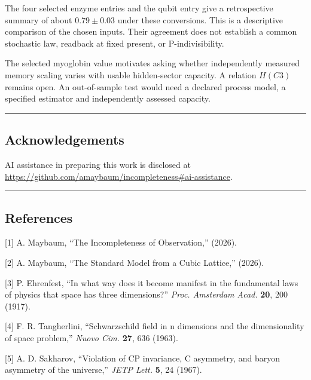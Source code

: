 \documentclass[
]{article}
\begin{document}
The four selected enzyme entries and the qubit entry give a
retrospective summary of about \(0.79\pm 0.03\) under these conversions.
This is a descriptive comparison of the chosen inputs. Their agreement
does not establish a common stochastic law, readback at fixed present,
or P-indivisibility.

The selected myoglobin value motivates asking whether independently
measured memory scaling varies with usable hidden-sector capacity. A
relation \(H(C3)\) remains open. An out-of-sample test would need a
declared process model, a specified estimator and independently assessed
capacity.

\begin{center}\rule{0.5\linewidth}{0.5pt}\end{center}

\hypertarget{acknowledgements}{%
\subsection{Acknowledgements}\label{acknowledgements}}

AI assistance in preparing this work is disclosed at\\
\url{https://github.com/amaybaum/incompleteness\#ai-assistance}.

\begin{center}\rule{0.5\linewidth}{0.5pt}\end{center}

\hypertarget{references}{%
\subsection{References}\label{references}}

{[}1{]} A. Maybaum, ``The Incompleteness of Observation,'' (2026).

{[}2{]} A. Maybaum, ``The Standard Model from a Cubic Lattice,'' (2026).

{[}3{]} P. Ehrenfest, ``In what way does it become manifest in the
fundamental laws of physics that space has three dimensions?''
\emph{Proc. Amsterdam Acad.} \textbf{20}, 200 (1917).

{[}4{]} F. R. Tangherlini, ``Schwarzschild field in n dimensions and the
dimensionality of space problem,'' \emph{Nuovo Cim.} \textbf{27}, 636
(1963).

{[}5{]} A. D. Sakharov, ``Violation of CP invariance, C asymmetry, and
baryon asymmetry of the universe,'' \emph{JETP Lett.} \textbf{5}, 24
(1967).
\end{document}
